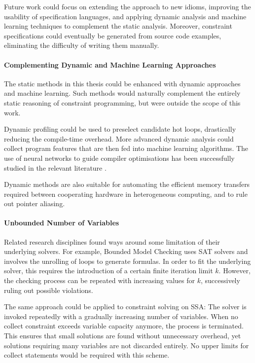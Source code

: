     Future work could focus on extending the approach to new idioms,
    improving the usability of specification languages, and applying dynamic
    analysis and machine learning techniques to complement the static analysis.
    Moreover, constraint specifications could eventually be generated from
    source code examples, eliminating the difficulty of writing them manually.

\paragraph*{Complementing Dynamic and Machine Learning Approaches}

    The static methods in this thesis could be enhanced with dynamic approaches
    and machine learning.
    Such methods would naturally complement the entirely static reasoning of
    constraint programming, but were outside the scope of this work.

    Dynamic profiling could be used to preselect candidate hot loops,
    drastically reducing the compile-time overhead.
    More advanced dynamic analysis could collect program features that are
    then fed into machine learning algorithms.
    The use of neural networks to guide compiler optimisations has been
    successfully studied in the relevant literature
    \citep{DBLP:journals/pieee/WangO18}.

    Dynamic methods are also suitable for automating the efficient memory
    transfers required between cooperating hardware in heterogeneous
    computing, and to rule out pointer aliasing.

\paragraph*{Unbounded Number of Variables}

    Related research disciplines found ways around some limitation of their
    underlying solvers.
    For example, Bounded Model Checking \cite{Clarke:2001:BMC:510986.510987}
    uses SAT solvers and involves the unrolling of loops to generate formulas.
    In order to fit the underlying solver, this requires the introduction of a
    certain finite iteration limit $k$.
    However, the checking process can be repeated with increasing values for
    $k$, successively ruling out possible violations.

    The same approach could be applied to constraint solving on SSA:
    The solver is invoked repeatedly with a gradually increasing number of
    variables.
    When no collect constraint exceeds variable capacity anymore, the
    process is terminated.
    This ensures that small solutions are found without unnecessary
    overhead, yet solutions requiring many variables are not discarded entirely.
    No upper limits for collect statements would be required with this scheme.

